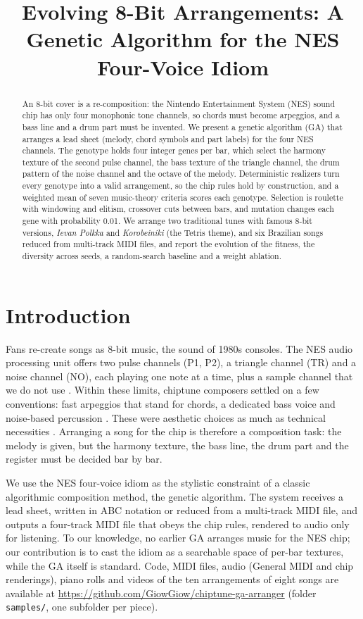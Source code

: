 \documentclass{article}
\title{Evolving 8-Bit Arrangements: A Genetic Algorithm for the NES Four-Voice Idiom}
\begin{document}
\maketitle

\begin{abstract}
An 8-bit cover is a re-composition: the Nintendo Entertainment System (NES) sound chip has only four monophonic tone channels, so chords must become arpeggios, and a bass line and a drum part must be invented. We present a genetic algorithm (GA) that arranges a lead sheet (melody, chord symbols
and part labels) for the four NES channels. The genotype holds four integer genes per bar, which
select the harmony texture of the second pulse channel, the bass texture of the triangle channel,
the drum pattern of the noise channel and the octave of the melody. Deterministic realizers turn
every genotype into a valid arrangement, so the chip rules hold by construction, and a weighted
mean of seven music-theory criteria scores each genotype. Selection is roulette with windowing and elitism, crossover cuts between bars, and mutation changes each gene with probability 0.01. We arrange two
traditional tunes with famous 8-bit versions, \emph{Ievan Polkka} and \emph{Korobeiniki} (the
Tetris theme), and six Brazilian songs reduced from multi-track MIDI files, and report the
evolution of the fitness, the diversity across seeds, a random-search baseline and a weight
ablation.
\end{abstract}

\section{Introduction}\label{sec:introduction}

Fans re-create songs as 8-bit music, the sound of 1980s consoles. The NES audio processing
unit offers two pulse channels (P1, P2), a triangle channel (TR) and a noise channel (NO), each playing one note at a time, plus a sample channel that we do not use \cite{donahue2018nes}. Within these limits, chiptune composers settled
on a few conventions: fast arpeggios that stand for chords, a dedicated bass voice and
noise-based percussion \cite{driscoll2009endless}. These were aesthetic choices as much as
technical necessities \cite{collins2007loop}. Arranging a song for the chip is therefore a
composition task: the melody is given, but the harmony texture, the bass line, the drum part and
the register must be decided bar by bar.

We use the NES four-voice idiom as the stylistic constraint of a classic algorithmic composition
method, the genetic algorithm. The system receives a lead sheet, written in ABC notation or reduced from a multi-track MIDI file, and outputs a four-track MIDI file that obeys the chip rules, rendered to audio only for listening. To our
knowledge, no earlier GA arranges music for the NES chip; our contribution is to cast the idiom as a searchable space of per-bar textures, while the GA itself is standard. Code, MIDI files, audio (General MIDI and chip renderings), piano rolls and videos of the ten arrangements of eight songs are available at \url{https://github.com/GiowGiow/chiptune-ga-arranger} (folder \texttt{samples/}, one subfolder per piece).
\end{document}
